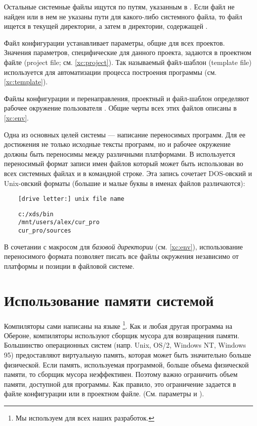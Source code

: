 Остальные системные файлы ищутся по путям, указанным в {\tt \red}.
Если файл {\tt \red} не найден или в нем не указаны пути для какого-либо
системного файла, то файл ищется в текущей директории, а затем в
директории, содержащей \xc{}.

Файл конфигурации устанавливает параметры, общие для всех проектов.
Значения параметров, специфические для данного проекта, задаются в
проектном файле (project file; см. \ref{xc:project}). 
Так называемый файл-шаблон (template file)
используется для автоматизации процесса построения программы (см.
\ref{xc:template}).

Файлы конфигурации и перенаправления, проектный и файл-шаблон
определяют рабочее окружение пользователя \XDS{}. Общие черты всех
этих файлов описаны в \ref{xc:env}.

Одна из основных целей системы \XDS{} --- написание переносимых программ.
Для ее достижения не только исходные тексты программ, но и рабочее
окружение должны быть переносимы между различными платформами.
В \XDS{} используется переносимый формат записи имен файлов
который может быть использован во всех системных файлах и в 
командной строке. Эта запись сочетает
DOS-овский и Unix-овский форматы (большие и малые буквы в именах файлов
различаются):
\begin{verbatim}
    [drive letter:] unix file name
\end{verbatim}

\Examples
\begin{verbatim}
    c:/xds/bin
    /mnt/users/alex/cur_pro
    cur_pro/sources
\end{verbatim}

В сочетании с макросом для {\em базовой директории} (см. \ref{xc:env}), 
использование переносимого формата позволяет писать все файлы окружения
независимо от платформы и позиции в файловой системе.

\section{Использование памяти системой \XDS{}}

Компиляторы \XDS{} сами написаны на языке \ot\footnote{Мы используем
\XDS{} для всех наших разработок.}. 
Как и любая другая программа на Обероне, компиляторы используют сборщик
мусора для возвращения памяти. Большинство операционных систем
(напр. Unix, OS/2, Windows NT, Windows 95) предоставляют виртуальную
память, которая может быть значительно больше физической. Если память,
используемая \ot{} программой, больше объема физической памяти, то
сборщик мусора неэффективен. Поэтому важно ограничить объем памяти,
доступной для программы. Как правило, это ограничение задается в 
файле конфигурации или в проектном файле. (См. параметры
 и ).

